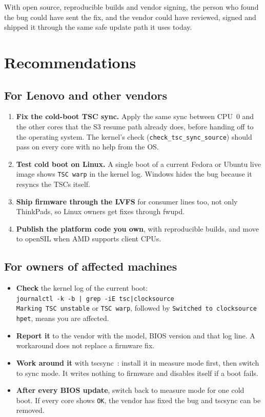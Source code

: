 \documentclass[11pt,a4paper]{article}
\newcommand{\code}[1]{\texttt{#1}}
\begin{document}
With open source, reproducible builds and vendor signing, the person who
found the bug could have sent the fix, and the vendor could have reviewed,
signed and shipped it through the same safe update path it uses today.

\section{Recommendations}

\subsection{For Lenovo and other vendors}
\begin{enumerate}
\item \textbf{Fix the cold-boot TSC sync.} Apply the same sync between CPU~0
  and the other cores that the S3 resume path already does, before handing
  off to the operating system. The kernel's check
  (\code{check\_tsc\_sync\_source}) should pass on every core with no help
  from the OS.
\item \textbf{Test cold boot on Linux.} A single boot of a current Fedora or
  Ubuntu live image shows \code{TSC warp} in the kernel log. Windows hides the
  bug because it resyncs the TSCs itself.
\item \textbf{Ship firmware through the LVFS} for consumer lines too, not
  only ThinkPads, so Linux owners get fixes through fwupd.
\item \textbf{Publish the platform code you own}, with reproducible builds,
  and move to openSIL when AMD supports client CPUs.
\end{enumerate}

\subsection{For owners of affected machines}
\begin{itemize}
\item \textbf{Check} the kernel log of the current boot:\\
  \code{journalctl -k -b | grep -iE \textquotesingle tsc|clocksource\textquotesingle}\\
  \code{Marking TSC unstable} or \code{TSC warp}, followed by
  \code{Switched to clocksource hpet}, means you are affected.
\item \textbf{Report it} to the vendor with the model, BIOS version and that
  log line. A workaround does not replace a firmware fix.
\item \textbf{Work around it} with tscsync~\cite{tscsync}: install it in
  measure mode first, then switch to sync mode. It writes nothing to firmware
  and disables itself if a boot fails.
\item \textbf{After every BIOS update}, switch back to measure mode for one
  cold boot. If every core shows \code{OK}, the vendor has fixed the bug and
  tscsync can be removed.
\end{itemize}
\end{document}
